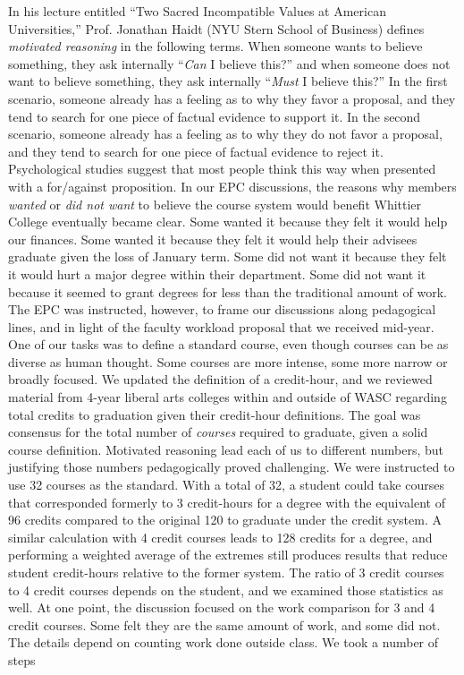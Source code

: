 \documentclass[../../../main.tex]{subfiles}
\begin{document}
In his lecture entitled ``Two Sacred Incompatible Values at American Universities,'' \cite{haidt} Prof. Jonathan Haidt (NYU Stern School of Business) defines \textit{motivated reasoning} in the following terms.  When someone wants to believe something, they ask internally ``\textit{Can} I believe this?'' and when someone does not want to believe something, they ask internally ``\textit{Must} I believe this?''  In the first scenario, someone already has a feeling as to why they favor a proposal, and they tend to search for one piece of factual evidence to support it.  In the second scenario, someone already has a feeling as to why they do not favor a proposal, and they tend to search for one piece of factual evidence to reject it.  Psychological studies suggest that most people think this way when presented with a for/against proposition.  In our EPC discussions, the reasons why members \textit{wanted} or \textit{did not want} to believe the course system would benefit Whittier College eventually became clear.  Some wanted it because they felt it would help our finances.  Some wanted it because they felt it would help their advisees graduate given the loss of January term.  Some did not want it because they felt it would hurt a major degree within their department.  Some did not want it because it seemed to grant degrees for less than the traditional amount of work.  The EPC was instructed, however, to frame our discussions along pedagogical lines, and in light of the faculty workload proposal that we received mid-year.
\\
\vspace{0.25cm}
One of our tasks was to define a standard course, even though courses can be as diverse as human thought.  Some courses are more intense, some more narrow or broadly focused.  We updated the definition of a credit-hour, and we reviewed material from 4-year liberal arts colleges within and outside of WASC regarding total credits to graduation given their credit-hour definitions.  The goal was consensus for the total number of \textit{courses} required to graduate, given a solid course definition.  Motivated reasoning lead each of us to different numbers, but justifying those numbers pedagogically proved challenging.  We were instructed to use 32 courses as the standard.  With a total of 32, a student could take courses that corresponded formerly to 3 credit-hours for a degree with the equivalent of 96 credits compared to the original 120 to graduate under the credit system.  A similar calculation with 4 credit courses leads to 128 credits for a degree, and performing a weighted average of the extremes still produces results that reduce student credit-hours relative to the former system.  The ratio of 3 credit courses to 4 credit courses depends on the student, and we examined those statistics as well.  At one point, the discussion focused on the work comparison for 3 and 4 credit courses.  Some felt they are the same amount of work, and some did not.  The details depend on counting work done outside class.  We took a number of steps
\end{document}
